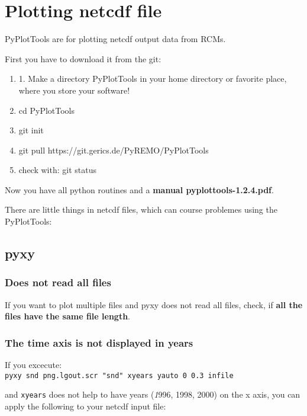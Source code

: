 \section{Plotting netcdf file}\label{PyPlotTools}

PyPlotTools are for plotting netcdf output data from RCMs.

First you have to download it from the git:
\begin{enumerate}
\item 1. Make a directory PyPlotTools in your home directory or favorite place, where you store your software!

\item cd PyPlotTools

\item git init

\item git pull https://git.gerics.de/PyREMO/PyPlotTools

\item check with: git status
\end{enumerate}

Now you have all python routines and a \textbf{manual pyplottools-1.2.4.pdf}.

There are little things in netcdf files, which can course problemes using the PyPlotTools:

\subsection{pyxy}

\subsubsection{Does not read all files}
If you want to plot multiple files and pyxy does not read all files, check, if
\textbf{all the files have the same file length}.

\subsubsection{The time axis is not displayed in years}
If you excecute:\\

\texttt{pyxy snd png.lgout.scr "snd" xyears yauto 0 0.3 infile}

and \texttt{xyears} does not help to have years (\textit 1996, 1998, 2000) on the x axis, you can apply the following to your netcdf input file:\\

